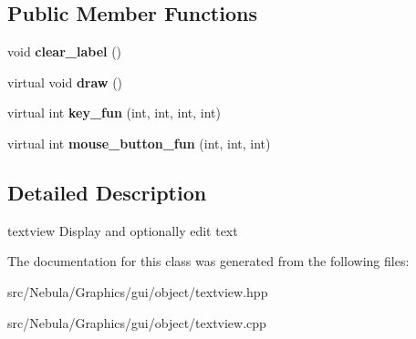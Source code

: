 \subsection*{\-Public \-Member \-Functions}
\begin{DoxyCompactItemize}
\item 
\hypertarget{classNeb_1_1gui_1_1object_1_1textview_a5d1069ed6e0b9922bca68c6b5deed78e}{void {\bfseries clear\-\_\-label} ()}\label{classNeb_1_1gui_1_1object_1_1textview_a5d1069ed6e0b9922bca68c6b5deed78e}

\item 
\hypertarget{classNeb_1_1gui_1_1object_1_1textview_a6dbfa06a5e62a0401ec61d91ea7b82ad}{virtual void {\bfseries draw} ()}\label{classNeb_1_1gui_1_1object_1_1textview_a6dbfa06a5e62a0401ec61d91ea7b82ad}

\item 
\hypertarget{classNeb_1_1gui_1_1object_1_1textview_ab93f2d1f2048fd8ac962c2507bdea381}{virtual int {\bfseries key\-\_\-fun} (int, int, int, int)}\label{classNeb_1_1gui_1_1object_1_1textview_ab93f2d1f2048fd8ac962c2507bdea381}

\item 
\hypertarget{classNeb_1_1gui_1_1object_1_1textview_aec400ee494b65de5b07026b6ab3e33c3}{virtual int {\bfseries mouse\-\_\-button\-\_\-fun} (int, int, int)}\label{classNeb_1_1gui_1_1object_1_1textview_aec400ee494b65de5b07026b6ab3e33c3}

\end{DoxyCompactItemize}


\subsection{\-Detailed \-Description}
textview \-Display and optionally edit text 

\-The documentation for this class was generated from the following files\-:\begin{DoxyCompactItemize}
\item 
src/\-Nebula/\-Graphics/gui/object/textview.\-hpp\item 
src/\-Nebula/\-Graphics/gui/object/textview.\-cpp\end{DoxyCompactItemize}
